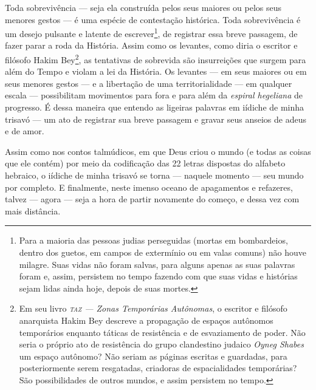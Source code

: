 Toda sobrevivência --- seja ela construída pelos seus maiores ou pelos
seus menores gestos --- é uma espécie de contestação histórica. Toda
sobrevivência é um desejo pulsante e latente de escrever\footnote{Para a
  maioria das pessoas judias perseguidas (mortas em bombardeios, dentro
  dos guetos, em campos de extermínio ou em valas comuns) não houve
  milagre. Suas vidas não foram salvas, para alguns apenas as suas
  palavras foram e, assim, persistem no tempo fazendo com que suas vidas
  e histórias sejam lidas ainda hoje, depois de suas mortes.}, de
registrar essa breve passagem, de fazer parar a roda da História. Assim
como os levantes, como diria o escritor e filósofo Hakim Bey\footnote{Em
  seu livro \emph{\textsc{taz} --- Zonas Temporárias Autônomas}, o escritor e
  filósofo anarquista Hakim Bey descreve a propagação de espaços
  autônomos temporários enquanto táticas de resistência e de
  esvaziamento de poder. Não seria o próprio ato de resistência do grupo
  clandestino judaico \emph{Oyneg Shabes} um espaço autônomo? Não seriam
  as páginas escritas e guardadas, para posteriormente serem resgatadas,
  criadoras de espacialidades temporárias? São possibilidades de outros
  mundos, e assim persistem no tempo.}, as tentativas de sobrevida são
insurreições que surgem para além do Tempo e violam a lei da História.
Os levantes --- em seus maiores ou em seus menores gestos --- e a
libertação de uma territorialidade --- em qualquer escala ---
possibilitam movimentos para fora e para além da \emph{espiral
hegeliana} de progresso. É dessa maneira que entendo as ligeiras
palavras em iídiche de minha trisavó --- um ato de registrar sua
breve passagem e gravar seus anseios de adeus e de amor.

Assim como nos contos talmúdicos, em que Deus criou o mundo (e
todas as coisas que ele contém) por meio da codificação das 22 letras
dispostas do alfabeto hebraico, o iídiche de minha trisavó se
torna --- naquele momento --- seu mundo por completo. E finalmente,
neste imenso oceano de apagamentos e refazeres, talvez --- agora ---
seja a hora de partir novamente do começo, e dessa vez com mais
distância.

\begin{center}\end{center}

